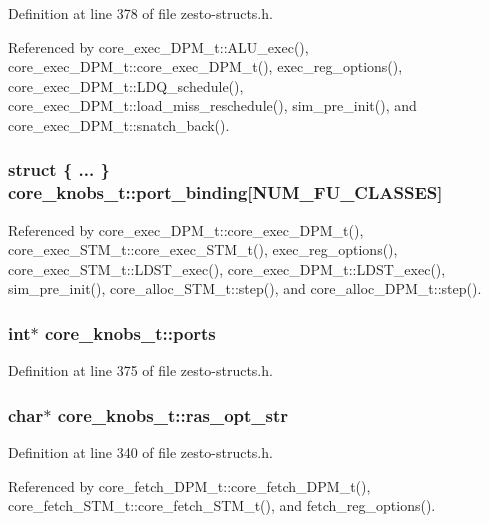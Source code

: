 Definition at line 378 of file zesto-structs.h.

Referenced by core\_\-exec\_\-DPM\_\-t::ALU\_\-exec(), core\_\-exec\_\-DPM\_\-t::core\_\-exec\_\-DPM\_\-t(), exec\_\-reg\_\-options(), core\_\-exec\_\-DPM\_\-t::LDQ\_\-schedule(), core\_\-exec\_\-DPM\_\-t::load\_\-miss\_\-reschedule(), sim\_\-pre\_\-init(), and core\_\-exec\_\-DPM\_\-t::snatch\_\-back().
\subsubsection[{port\_\-binding}]{\setlength{\rightskip}{0pt plus 5cm}struct \{ ... \}   {\bf core\_\-knobs\_\-t::port\_\-binding}[NUM\_\-FU\_\-CLASSES]}\label{structcore__knobs__t_f4546e186d02184b706cbf20e189d5e8}




Referenced by core\_\-exec\_\-DPM\_\-t::core\_\-exec\_\-DPM\_\-t(), core\_\-exec\_\-STM\_\-t::core\_\-exec\_\-STM\_\-t(), exec\_\-reg\_\-options(), core\_\-exec\_\-STM\_\-t::LDST\_\-exec(), core\_\-exec\_\-DPM\_\-t::LDST\_\-exec(), sim\_\-pre\_\-init(), core\_\-alloc\_\-STM\_\-t::step(), and core\_\-alloc\_\-DPM\_\-t::step().
\subsubsection[{ports}]{\setlength{\rightskip}{0pt plus 5cm}int$\ast$ {\bf core\_\-knobs\_\-t::ports}}\label{structcore__knobs__t_935930f0bf27e1415260b789db02161b}




Definition at line 375 of file zesto-structs.h.
\subsubsection[{ras\_\-opt\_\-str}]{\setlength{\rightskip}{0pt plus 5cm}char$\ast$ {\bf core\_\-knobs\_\-t::ras\_\-opt\_\-str}}\label{structcore__knobs__t_ee9e161a82f92a89a8c7b073e90ba235}




Definition at line 340 of file zesto-structs.h.

Referenced by core\_\-fetch\_\-DPM\_\-t::core\_\-fetch\_\-DPM\_\-t(), core\_\-fetch\_\-STM\_\-t::core\_\-fetch\_\-STM\_\-t(), and fetch\_\-reg\_\-options().
